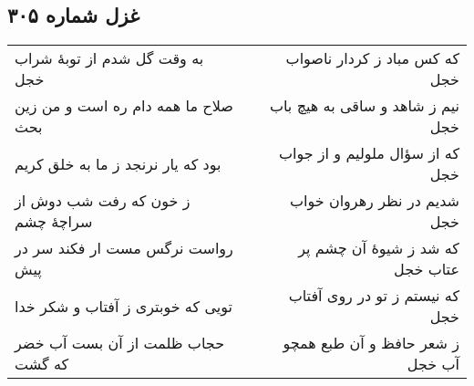 \begin{center}
\section*{غزل شماره ۳۰۵}
\label{sec:sh305}
\begin{longtable}{l p{0.5cm} r}
به وقت گل شدم از توبهٔ شراب خجل
&&
که کس مباد ز کردار ناصواب خجل
\\
صلاح ما همه دام ره است و من زین بحث
&&
نیم ز شاهد و ساقی به هیچ باب خجل
\\
بود که یار نرنجد ز ما به خلق کریم
&&
که از سؤال ملولیم و از جواب خجل
\\
ز خون که رفت شب دوش از سراچهٔ چشم
&&
شدیم در نظر رهروان خواب خجل
\\
رواست نرگس مست ار فکند سر در پیش
&&
که شد ز شیوهٔ آن چشم پر عتاب خجل
\\
تویی که خوبتری ز آفتاب و شکر خدا
&&
که نیستم ز تو در روی آفتاب خجل
\\
حجاب ظلمت از آن بست آب خضر که گشت
&&
ز شعر حافظ و آن طبع همچو آب خجل
\\
\end{longtable}
\end{center}
